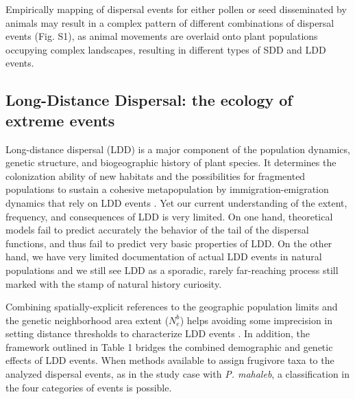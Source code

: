 \documentclass[a4paper, 12pt]{article}
\begin{document}
\begin{linenumbers}
Empirically mapping of dispersal events for either pollen or seed disseminated by animals may result in a complex pattern of different combinations of dispersal events (Fig. S1), as animal movements are overlaid onto plant populations occupying complex landscapes, resulting in different types of SDD and LDD events. 



\subsection*{Long-Distance Dispersal: the ecology of extreme events}

Long-distance dispersal (LDD) is a major component of the population dynamics, genetic structure, and biogeographic history of plant species. It determines the colonization ability of new habitats and the possibilities for fragmented populations to sustain a cohesive metapopulation by immigration-emigration dynamics that rely on LDD events \citep{Nathan:2008is,Schurr2009long}. Yet our current understanding of the extent, frequency, and consequences of LDD is very limited. On one hand, theoretical models fail to predict accurately the behavior of the tail of the dispersal functions, and thus fail to predict very basic properties of LDD. On the other hand, we have very limited documentation of actual LDD events in natural populations and we still see LDD as a sporadic, rarely far-reaching process still marked with the stamp of natural history curiosity.

Combining spatially-explicit references to the geographic population limits and the genetic neighborhood area extent ($N^b_e$) helps avoiding some imprecision in setting distance thresholds to characterize LDD events \citep{Jones:2008il}. In addition, the framework outlined in Table 1 bridges the combined demographic and genetic effects of LDD events. When methods available to assign frugivore taxa to the analyzed dispersal events, as in the study case with \textit{P. mahaleb}, a classification in the four categories of events is possible. 


\end{linenumbers}
\end{document}
